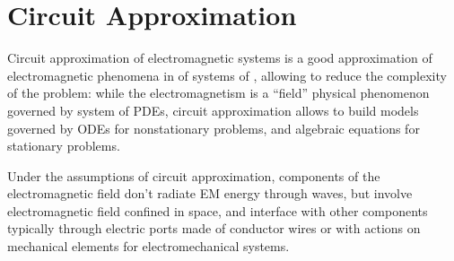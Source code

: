 \documentclass[letterpaper,10pt,english]{jupyterBook}
\begin{document}
\sphinxstepscope


\chapter{Circuit Approximation}
\label{\detokenize{ch/circuits:circuit-approximation}}\label{\detokenize{ch/circuits:classical-electromagnetism-electrical-engineering}}\label{\detokenize{ch/circuits::doc}}
\sphinxAtStartPar
Circuit approximation of electromagnetic systems is a good approximation of electromagnetic phenomena in  of systems of , allowing to reduce the complexity of the problem: while the electromagnetism is a “field” physical phenomenon governed by system of PDEs, circuit approximation allows to build models governed by ODEs for non\sphinxhyphen{}stationary problems, and algebraic equations for stationary problems.

\sphinxAtStartPar
Under the assumptions of circuit approximation, components of the electromagnetic field don’t radiate EM energy through waves, but involve electromagnetic field confined in space, and interface with other components typically through electric ports made of conductor wires \sphinxhyphen{} or with actions on mechanical elements for electro\sphinxhyphen{}mechanical systems.
\end{document}
